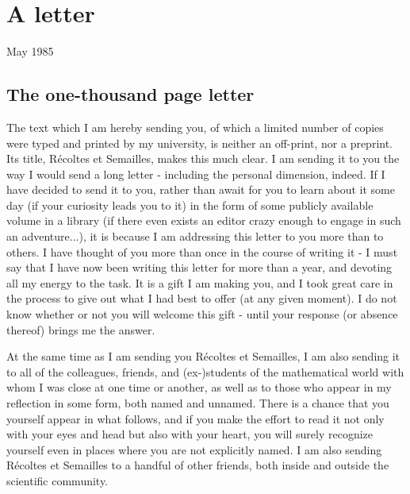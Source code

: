 \begin{comment}
\documentclass{book}
\usepackage{master}
\newcommand{\rec}{$\text{R\'ecoltes et Semailles}$}
\newcommand{\no}{n$^\circ$}
\hfuzz = 100pt

\setcounter{chapter}{2}
\end{comment}

\chapter{A letter}

May 1985

\section{The one-thousand page letter}

The text which I am hereby sending you, of which a limited number of copies were typed and printed by my university, is neither an off-print, nor a preprint. Its title, R\'ecoltes et Semailles, makes this much clear. I am sending it to you the way I would send a long letter - including the personal dimension, indeed. If I have decided to send it to you, rather than await for you to learn about it some day (if your curiosity leads you to it) in the form of some publicly available volume in a library (if there even exists an editor crazy enough to engage in such an adventure...), it is because I am addressing this letter to you more than to others. I have thought of you more than once in the course of writing it - I must say that I have now been writing this letter for more than a year, and devoting all my energy to the task. It is a gift I am making you, and I took great care in the process to give out what I had best to offer (at any given moment). I do not know whether or not you will welcome this gift - until your response (or absence thereof) brings me the answer. 

At the same time as I am sending you R\'ecoltes et Semailles, I am also sending it to all of the colleagues, friends, and (ex-)students of the mathematical world with whom I was close at one time or another, as well as to those who appear in my reflection in some form, both named and unnamed. There is a chance that you yourself appear in what follows, and if you make the effort to read it not only with your eyes and head but also with your heart, you will surely recognize yourself even in places where you are not explicitly named. I am also sending R\'ecoltes et Semailles to a handful of other friends, both inside and outside the scientific community.

